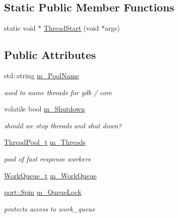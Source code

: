 \subsection*{Static Public Member Functions}
\begin{DoxyCompactItemize}
\item 
static void $\ast$ \hyperlink{classleveldb_1_1_hot_thread_pool_ad002c307f26506b3ee24fdcce111af4b}{Thread\+Start} (void $\ast$args)
\end{DoxyCompactItemize}
\subsection*{Public Attributes}
\begin{DoxyCompactItemize}
\item 
std\+::string \hyperlink{classleveldb_1_1_hot_thread_pool_a03b0d2067849f04918927772f5b44770}{m\+\_\+\+Pool\+Name}
\begin{DoxyCompactList}\small\item\em used to name threads for gdb / core \end{DoxyCompactList}\item 
volatile bool \hyperlink{classleveldb_1_1_hot_thread_pool_aa0bf6b3ad8b624bc6e41dec5c702f8a8}{m\+\_\+\+Shutdown}
\begin{DoxyCompactList}\small\item\em should we stop threads and shut down? \end{DoxyCompactList}\item 
\hyperlink{classleveldb_1_1_hot_thread_pool_a0d8e96c9dc8fc9fc9ec68acd11a6af71}{Thread\+Pool\+\_\+t} \hyperlink{classleveldb_1_1_hot_thread_pool_a79c90db2f251666fd715d79c3fe2c107}{m\+\_\+\+Threads}
\begin{DoxyCompactList}\small\item\em pool of fast response workers \end{DoxyCompactList}\item 
\hyperlink{classleveldb_1_1_hot_thread_pool_a00b8e7f713908bfc81fb312ec78da744}{Work\+Queue\+\_\+t} \hyperlink{classleveldb_1_1_hot_thread_pool_a798f6a1fa0e086801bc3a23ad86a4ee1}{m\+\_\+\+Work\+Queue}
\item 
\hyperlink{namespaceleveldb_1_1port_a3017c82209c2da44f142ef633e012149}{port\+::\+Spin} \hyperlink{classleveldb_1_1_hot_thread_pool_a37f97bceb4dc661a524433f6c5459cd1}{m\+\_\+\+Queue\+Lock}
\begin{DoxyCompactList}\small\item\em protects access to work\+\_\+queue \end{DoxyCompactList}\item 

\end{DoxyCompactItemize}
